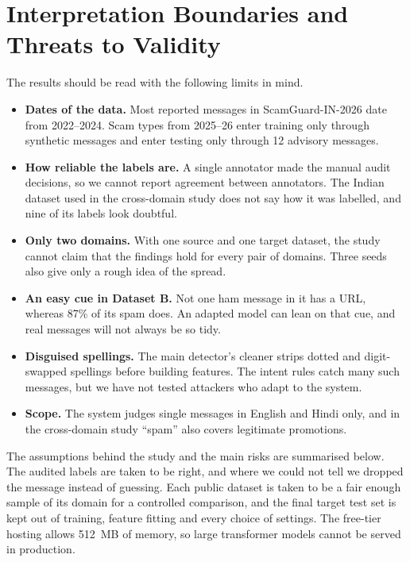 \section{Interpretation Boundaries and Threats to Validity}
The results should be read with the following limits in mind.
\begin{itemize}
\item \textbf{Dates of the data.} Most reported messages in ScamGuard-IN-2026 date from 2022--2024. Scam types from 2025--26 enter training only through synthetic messages and enter testing only through 12 advisory messages.
\item \textbf{How reliable the labels are.} A single annotator made the manual audit decisions, so we cannot report agreement between annotators. The Indian dataset used in the cross-domain study does not say how it was labelled, and nine of its labels look doubtful.
\item \textbf{Only two domains.} With one source and one target dataset, the study cannot claim that the findings hold for every pair of domains. Three seeds also give only a rough idea of the spread.
\item \textbf{An easy cue in Dataset B.} Not one ham message in it has a URL, whereas 87\% of its spam does. An adapted model can lean on that cue, and real messages will not always be so tidy.
\item \textbf{Disguised spellings.} The main detector's cleaner strips dotted and digit-swapped spellings before building features. The intent rules catch many such messages, but we have not tested attackers who adapt to the system.
\item \textbf{Scope.} The system judges single messages in English and Hindi only, and in the cross-domain study ``spam'' also covers legitimate promotions.
\end{itemize}

The assumptions behind the study and the main risks are summarised below. The audited labels are taken to be right, and where we could not tell we dropped the message instead of guessing. Each public dataset is taken to be a fair enough sample of its domain for a controlled comparison, and the final target test set is kept out of training, feature fitting and every choice of settings. The free-tier hosting allows 512~MB of memory, so large transformer models cannot be served in production.

